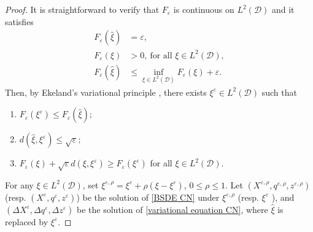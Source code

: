 \documentclass[11pt,a4paper]{article}
\begin{document}
\begin{proof}
   It is straightforward to verify that $F_\varepsilon $ is continuous on $L^2 (\mathcal D)$ and it satisfies 
\begin{align*} F_\varepsilon(\hat \xi) &=\varepsilon,\\
    F_\varepsilon(\xi)& >0, \ \textrm{for all } \xi \in L^2 (\mathcal D),\\
    F_\varepsilon(\hat \xi) & \leq \inf_{\xi \in L^2 (\mathcal D)}F_\varepsilon(\xi)+\varepsilon .
    \end{align*}
Then, by Ekeland's variational principle \cite{Ekeland}, there exists $\xi^\varepsilon \in L^2 (\mathcal D)$ such that
\begin{enumerate}[label=(\roman*)]
    \item $F_\varepsilon(\xi^\varepsilon)\leq F_\varepsilon(\hat \xi);$
    \item $d(\hat \xi,\xi^\varepsilon)\leq \sqrt{\varepsilon};$
    \item $F_\varepsilon(\xi)+\sqrt{\varepsilon}d(\xi,\xi^\varepsilon) \geq F_\varepsilon(\xi^\varepsilon)$ for all $\xi \in L^2 (\mathcal D)$.
\end{enumerate}
For any $\xi \in L^2 (\mathcal D)$, set  $\xi^{\varepsilon, \rho}=\xi^\varepsilon+\rho(\xi-\xi^\varepsilon)$, $ 0 \leq\rho \leq 1$. Let $(X^{\varepsilon,\rho},q^{\varepsilon,\rho}, z^{\varepsilon,\rho} )$ (resp. $(X^\varepsilon,q^\varepsilon, z^\varepsilon ) $) be the solution of \eqref{BSDE CN} under $\xi^{\varepsilon,\rho}$ (resp. $\xi^\varepsilon$ ), and $(\Delta{X}^\varepsilon,\Delta{q}^\varepsilon, \Delta{z}^\varepsilon )$ be the solution of \eqref{variational equation CN}, where $\hat \xi$ is replaced by $\xi^\varepsilon$. 


\end{proof}
\end{document}
